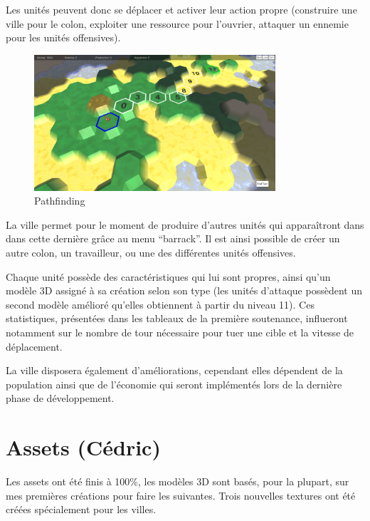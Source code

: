 \documentclass[12pt]{report}
\begin{document}
Les unités peuvent donc se déplacer et activer leur action propre (construire
une ville pour le colon, exploiter une ressource pour l'ouvrier, attaquer un 
ennemie pour les unités offensives).

\begin{figure}[H]
    \centering
    \includegraphics[width=0.8\textwidth]{Pathfinding}
    \caption{Pathfinding}
\end{figure}

La ville permet pour le moment de produire d’autres unités qui apparaîtront dans
dans cette dernière grâce au menu “barrack”. Il est ainsi possible de créer un
autre colon, un travailleur, ou une des différentes unités offensives.

Chaque unité possède des caractéristiques qui lui sont propres, ainsi qu’un
modèle 3D assigné à sa création selon son type (les unités d’attaque possèdent
un second modèle amélioré qu’elles obtiennent à partir du niveau 11). Ces
statistiques, présentées dans les tableaux de la première soutenance, influeront
notamment sur le nombre de tour nécessaire pour tuer une cible et  la vitesse de
déplacement.

La ville disposera également d’améliorations, cependant elles dépendent de la
population ainsi que de l’économie qui seront implémentés lors de la dernière
phase de développement.

\section{Assets (Cédric)}

Les assets ont été finis à 100\%, les modèles 3D sont basés, pour la plupart,
sur mes premières créations pour faire les suivantes. Trois nouvelles textures
ont été créées spécialement pour les villes.
\end{document}
